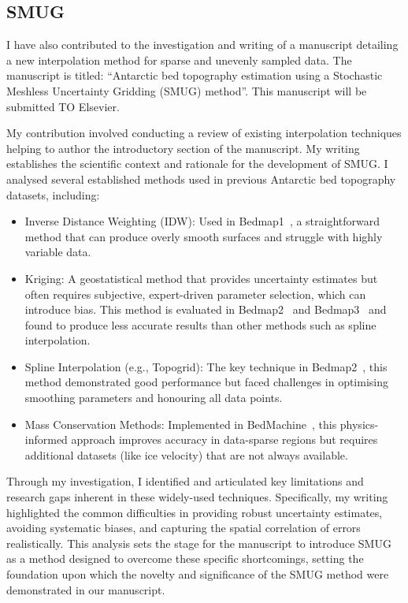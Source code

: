 \newpage
\subsection{SMUG}
I have also contributed to the investigation and writing of a manuscript detailing a new interpolation method for sparse and unevenly sampled data. The manuscript is titled: ``Antarctic bed topography estimation using a Stochastic Meshless Uncertainty Gridding (SMUG) method''. This manuscript will be submitted TO Elsevier.

My contribution involved conducting a review of existing interpolation techniques helping to author the introductory section of the manuscript. My writing establishes the scientific context and rationale for the development of SMUG. I analysed several established methods used in previous Antarctic bed topography datasets, including:

\begin{itemize}
    \item{Inverse Distance Weighting (IDW)}: Used in Bedmap1~\cite{Lythe_2001}, a straightforward method that can produce overly smooth surfaces and struggle with highly variable data.

    \item{Kriging}: A geostatistical method that provides uncertainty estimates but often requires subjective, expert-driven parameter selection, which can introduce bias. This method is evaluated in Bedmap2~\cite{Fretwell_2013} and Bedmap3~\cite{Pritchard_2025} and found to produce less accurate results than other methods such as spline interpolation.

    \item{Spline Interpolation (e.g., Topogrid)}: The key technique in Bedmap2~\cite{Fretwell_2013}, this method demonstrated good performance but faced challenges in optimising smoothing parameters and honouring all data points.

    \item{Mass Conservation Methods}: Implemented in BedMachine~\cite{Morlighem_2020}, this physics-informed approach improves accuracy in data-sparse regions but requires additional datasets (like ice velocity) that are not always available.
\end{itemize}

Through my investigation, I identified and articulated key limitations and research gaps inherent in these widely-used techniques. Specifically, my writing highlighted the common difficulties in providing robust uncertainty estimates, avoiding systematic biases, and capturing the spatial correlation of errors realistically. This analysis sets the stage for the manuscript to introduce SMUG as a method designed to overcome these specific shortcomings, setting the foundation upon which the novelty and significance of the SMUG method were demonstrated in our manuscript.

